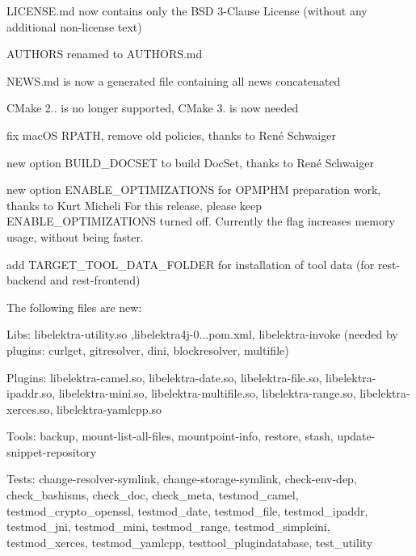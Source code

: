 \begin{DoxyItemize}
\item L\+I\+C\+E\+N\+S\+E.\+md now contains only the B\+SD 3-\/\+Clause License (without any additional non-\/license text)
\item A\+U\+T\+H\+O\+RS renamed to A\+U\+T\+H\+O\+R\+S.\+md
\item N\+E\+W\+S.\+md is now a generated file containing all news concatenated
\item C\+Make 2.. is no longer supported, C\+Make 3. is now needed
\item fix mac\+OS {\ttfamily R\+P\+A\+TH}, remove old policies, thanks to René Schwaiger
\item new option {\ttfamily B\+U\+I\+L\+D\+\_\+\+D\+O\+C\+S\+ET} to build Doc\+Set, thanks to René Schwaiger
\item new option {\ttfamily E\+N\+A\+B\+L\+E\+\_\+\+O\+P\+T\+I\+M\+I\+Z\+A\+T\+I\+O\+NS} for {\ttfamily O\+P\+M\+P\+HM} preparation work, thanks to Kurt Micheli For this release, please keep {\ttfamily E\+N\+A\+B\+L\+E\+\_\+\+O\+P\+T\+I\+M\+I\+Z\+A\+T\+I\+O\+NS} turned off. Currently the flag increases memory usage, without being faster.
\item add {\ttfamily T\+A\+R\+G\+E\+T\+\_\+\+T\+O\+O\+L\+\_\+\+D\+A\+T\+A\+\_\+\+F\+O\+L\+D\+ER} for installation of tool data (for rest-\/backend and rest-\/frontend)
\end{DoxyItemize}

The following files are new\+:


\begin{DoxyItemize}
\item Libs\+: {\ttfamily libelektra-\/utility.\+so} ,{\ttfamily libelektra4j-\/0...\+pom.\+xml}, {\ttfamily libelektra-\/invoke} (needed by plugins\+: curlget, gitresolver, dini, blockresolver, multifile)
\item Plugins\+: {\ttfamily libelektra-\/camel.\+so}, {\ttfamily libelektra-\/date.\+so}, {\ttfamily libelektra-\/file.\+so}, {\ttfamily libelektra-\/ipaddr.\+so}, {\ttfamily libelektra-\/mini.\+so}, {\ttfamily libelektra-\/multifile.\+so}, {\ttfamily libelektra-\/range.\+so}, {\ttfamily libelektra-\/xerces.\+so}, {\ttfamily libelektra-\/yamlcpp.\+so}
\item Tools\+: {\ttfamily backup}, {\ttfamily mount-\/list-\/all-\/files}, {\ttfamily mountpoint-\/info}, {\ttfamily restore}, {\ttfamily stash}, {\ttfamily update-\/snippet-\/repository}
\item Tests\+: {\ttfamily change-\/resolver-\/symlink}, {\ttfamily change-\/storage-\/symlink}, {\ttfamily check-\/env-\/dep}, {\ttfamily check\+\_\+bashisms}, {\ttfamily check\+\_\+doc}, {\ttfamily check\+\_\+meta}, {\ttfamily testmod\+\_\+camel}, {\ttfamily testmod\+\_\+crypto\+\_\+openssl}, {\ttfamily testmod\+\_\+date}, {\ttfamily testmod\+\_\+file}, {\ttfamily testmod\+\_\+ipaddr}, {\ttfamily testmod\+\_\+jni}, {\ttfamily testmod\+\_\+mini}, {\ttfamily testmod\+\_\+range}, {\ttfamily testmod\+\_\+simpleini}, {\ttfamily testmod\+\_\+xerces}, {\ttfamily testmod\+\_\+yamlcpp}, {\ttfamily testtool\+\_\+plugindatabase}, {\ttfamily test\+\_\+utility}
\end{DoxyItemize}

